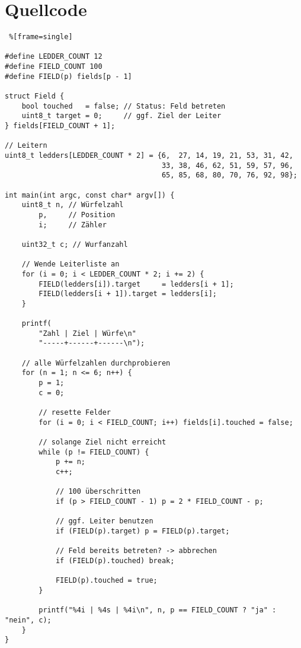 \documentclass[a4paper,10pt,ngerman]{scrartcl}
\begin{document}
\section{Quellcode}

\begin{lstlisting} %[frame=single]

#define LEDDER_COUNT 12
#define FIELD_COUNT 100
#define FIELD(p) fields[p - 1]

struct Field {
    bool touched   = false; // Status: Feld betreten
    uint8_t target = 0;     // ggf. Ziel der Leiter
} fields[FIELD_COUNT + 1];

// Leitern
uint8_t ledders[LEDDER_COUNT * 2] = {6,  27, 14, 19, 21, 53, 31, 42,
                                     33, 38, 46, 62, 51, 59, 57, 96,
                                     65, 85, 68, 80, 70, 76, 92, 98};

int main(int argc, const char* argv[]) {
    uint8_t n, // Würfelzahl
        p,     // Position
        i;     // Zähler

    uint32_t c; // Wurfanzahl

    // Wende Leiterliste an
    for (i = 0; i < LEDDER_COUNT * 2; i += 2) {
        FIELD(ledders[i]).target     = ledders[i + 1];
        FIELD(ledders[i + 1]).target = ledders[i];
    }

    printf(
        "Zahl | Ziel | Würfe\n"
        "-----+------+------\n");

    // alle Würfelzahlen durchprobieren
    for (n = 1; n <= 6; n++) {
        p = 1;
        c = 0;

        // resette Felder
        for (i = 0; i < FIELD_COUNT; i++) fields[i].touched = false;

        // solange Ziel nicht erreicht
        while (p != FIELD_COUNT) {
            p += n;
            c++;

            // 100 überschritten
            if (p > FIELD_COUNT - 1) p = 2 * FIELD_COUNT - p;

            // ggf. Leiter benutzen
            if (FIELD(p).target) p = FIELD(p).target;

            // Feld bereits betreten? -> abbrechen
            if (FIELD(p).touched) break;

            FIELD(p).touched = true;
        }

        printf("%4i | %4s | %4i\n", n, p == FIELD_COUNT ? "ja" : "nein", c);
    }
}
\end{lstlisting}
\end{document}
